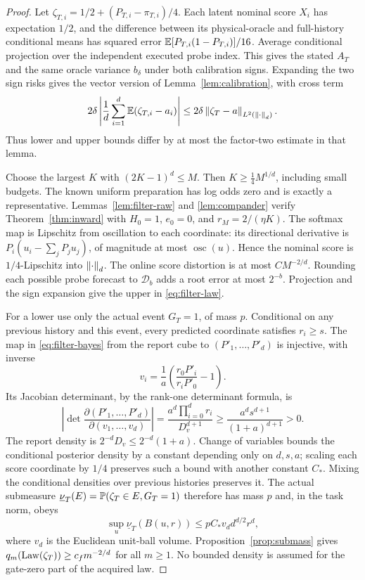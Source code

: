 \begin{proof}
Let $\zeta_{T,i}=1/2+(P_{T,i}-\pi_{T,i})/4$. Each latent nominal score $X_i$ has expectation $1/2$, and the difference between its physical-oracle and full-history conditional means has squared error $\mathbb E[P_{T,i}(1-P_{T,i})]/16$. Average conditional projection over the independent executed probe index. This gives the stated $A_T$ and the same oracle variance $b_\delta$ under both calibration signs. Expanding the two sign risks gives the vector version of Lemma~\ref{lem:calibration}, with cross term
\[
 2\delta\left|\frac1d\sum_{i=1}^d\mathbb E(\zeta_{T,i}-a_i)\right|
 \le 2\delta\left\lVert\zeta_T-a\right\rVert_{L^2(\left\lVert\cdot\right\rVert_d)}.
\]
Thus lower and upper bounds differ by at most the factor-two estimate in that lemma.

Choose the largest $K$ with $(2K-1)^d\le M$. Then $K\ge\tfrac14M^{1/d}$, including small budgets. The known uniform preparation has log odds zero and is exactly a representative. Lemmas~\ref{lem:filter-raw} and \ref{lem:compander} verify Theorem~\ref{thm:inward} with $H_0=1$, $e_0=0$, and $r_M=2/(\eta K)$. The softmax map is Lipschitz from oscillation to each coordinate: its directional derivative is $P_i(u_i-\sum_jP_ju_j)$, of magnitude at most $\operatorname{osc}(u)$. Hence the nominal score is $1/4$-Lipschitz into $\left\lVert\cdot\right\rVert_d$. The online score distortion is at most $C M^{-2/d}$. Rounding each possible probe forecast to $\mathcal D_b$ adds a root error at most $2^{-b}$. Projection and the sign expansion give the upper in \eqref{eq:filter-law}.

For a lower use only the actual event $G_T=1$, of mass $p$. Conditional on any previous history and this event, every predicted coordinate satisfies $r_i\ge s$. The map in \eqref{eq:filter-bayes} from the report cube to $(P'_1,\ldots,P'_d)$ is injective, with inverse
\[
 v_i=\frac1a\left(\frac{r_0P'_i}{r_iP'_0}-1\right).
\]
Its Jacobian determinant, by the rank-one determinant formula, is
\begin{equation}\label{eq:filter-jacobian}
 \left|\det\frac{\partial(P'_1,\ldots,P'_d)}{\partial(v_1,\ldots,v_d)}\right|
 =\frac{a^d\prod_{i=0}^d r_i}{D_v^{d+1}}
 \ge \frac{a^d s^{d+1}}{(1+a)^{d+1}}>0.
\end{equation}
The report density is $2^{-d}D_v\le2^{-d}(1+a)$. Change of variables bounds the conditional posterior density by a constant depending only on $d,s,a$; scaling each score coordinate by $1/4$ preserves such a bound with another constant $C_*$. Mixing the conditional densities over previous histories preserves it. The actual submeasure $\underline\nu_T(E)=\mathbb P(\zeta_T\in E,G_T=1)$ therefore has mass $p$ and, in the task norm, obeys
\[
 \sup_u\underline\nu_T(B(u,r))
 \le pC_*v_d d^{d/2}r^d,
\]
where $v_d$ is the Euclidean unit-ball volume. Proposition~\ref{prop:submass} gives $q_m(\operatorname{Law}(\zeta_T))\ge c_fm^{-2/d}$ for all $m\ge1$. No bounded density is assumed for the gate-zero part of the acquired law.


\end{proof}
